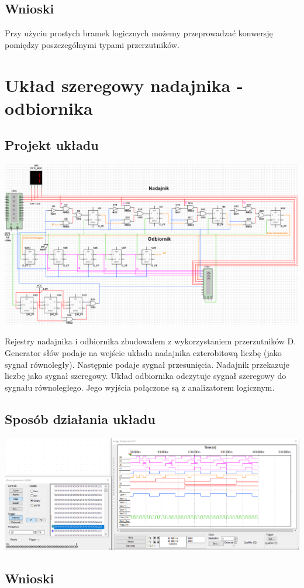 \documentclass{article}
\begin{document}
            
        \subsection{Wnioski}
            Przy użyciu prostych bramek logicznych możemy przeprowadzać konwersję pomiędzy poszczególnymi typami przerzutników.
    
    \section{Układ szeregowy nadajnika - odbiornika}
        \subsection{Projekt układu}
            \begin{center}
                \includegraphics[width=18cm]{reports/img/Z2C_1.png}\\
            \end{center}
            Rejestry nadajnika i odbiornika zbudowałem z wykorzystaniem przerzutników D. Generator słów podaje na wejście układu nadajnika czterobitową liczbę (jako sygnał równoległy). Następnie podaje sygnał przesunięcia. Nadajnik przekazuje liczbę jako sygnał szeregowy. Układ odbiornika odczytuje sygnał szeregowy do sygnału równoległego. Jego wyjścia połączone są z analizatorem logicznym. 
            
        \subsection{Sposób działania układu}
            \begin{center}
                \includegraphics[width=18cm]{reports/img/Z2C_2.png}\\
            \end{center}
            
        \subsection{Wnioski}
\end{document}
